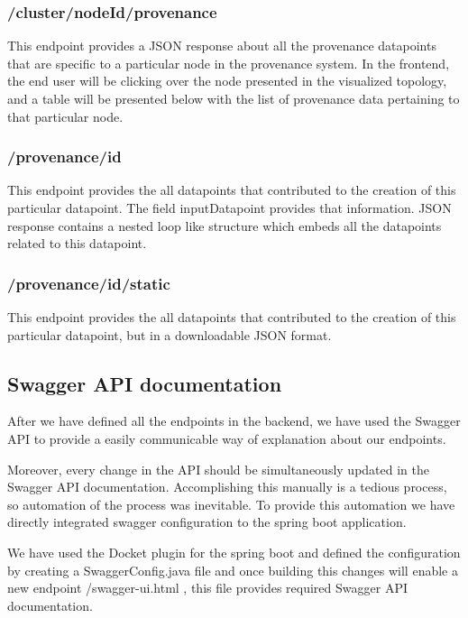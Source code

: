\subsubsection{/cluster/{nodeId}/provenance}

This endpoint provides a JSON response about all the provenance datapoints that are specific to a particular node in the provenance system. In the frontend, the end user will be clicking over the node presented in the visualized topology, and a table will be presented below with the list of provenance data pertaining to that particular node.

\subsubsection{/provenance/{id}}

This endpoint provides the all datapoints that contributed to the creation of this particular datapoint. The field inputDatapoint provides that information. JSON response contains a nested loop like structure which embeds all the datapoints related to this datapoint. 

\subsubsection{/provenance/{id}/static}

This endpoint provides the all datapoints that contributed to the creation of this particular datapoint, but in a downloadable JSON format.

\subsection{Swagger API documentation}

After we have defined all the endpoints in the backend, we have used the Swagger API to provide a easily communicable way of explanation about our endpoints. 

Moreover, every change in the API should be simultaneously updated in the Swagger API documentation. Accomplishing this manually is a tedious process, so automation of the process was inevitable. To provide this automation we have directly integrated swagger configuration to the spring boot application.

We have used the Docket plugin for the spring boot and defined the configuration by creating a SwaggerConfig.java file and once building this changes will enable a new endpoint /swagger-ui.html , this file provides required Swagger API documentation.


